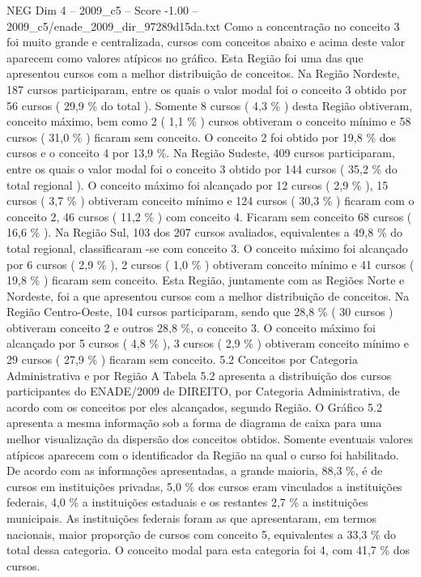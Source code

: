 \begin{textsample}{NEG Dim 4 – 2009\_c5 – Score -1.00 – 2009\_c5/enade\_2009\_dir\_97289d15da.txt}
Como a concentração no conceito 3 foi muito grande e centralizada, cursos com conceitos abaixo e acima deste valor aparecem como valores atípicos no gráfico.
Esta Região foi uma das que apresentou cursos com a melhor distribuição de conceitos.
Na Região Nordeste, 187 cursos participaram, entre os quais o valor modal foi o conceito 3 obtido por 56 cursos ( 29,9 \% do total ).
Somente 8 cursos ( 4,3 \% ) desta Região obtiveram, conceito máximo, bem como 2 ( 1,1 \% ) cursos obtiveram o conceito mínimo e 58 cursos ( 31,0 \% ) ficaram sem conceito.
O conceito 2 foi obtido por 19,8 \% dos cursos e o conceito 4 por 13,9 \%.
Na Região Sudeste, 409 cursos participaram, entre os quais o valor modal foi o conceito 3 obtido por 144 cursos ( 35,2 \% do total regional ).
O conceito máximo foi alcançado por 12 cursos ( 2,9 \% ), 15 cursos ( 3,7 \% ) obtiveram conceito mínimo e 124 cursos ( 30,3 \% ) ficaram com o conceito 2, 46 cursos ( 11,2 \% ) com conceito 4.
Ficaram sem conceito 68 cursos ( 16,6 \% ).
Na Região Sul, 103 dos 207 cursos avaliados, equivalentes a 49,8 \% do total regional, classificaram -se com conceito 3.
O conceito máximo foi alcançado por 6 cursos ( 2,9 \% ), 2 cursos ( 1,0 \% ) obtiveram conceito mínimo e 41 cursos ( 19,8 \% ) ficaram sem conceito.
Esta Região, juntamente com as Regiões Norte e Nordeste, foi a que apresentou cursos com a melhor distribuição de conceitos.
Na Região Centro-Oeste, 104 cursos participaram, sendo que 28,8 \% ( 30 cursos ) obtiveram conceito 2 e outros 28,8 \%, o conceito 3.
O conceito máximo foi alcançado por 5 cursos ( 4,8 \% ), 3 cursos ( 2,9 \% ) obtiveram conceito mínimo e 29 cursos ( 27,9 \% ) ficaram sem conceito. 5.2 Conceitos por Categoria Administrativa e por Região A Tabela 5.2 apresenta a distribuição dos cursos participantes do ENADE/2009 de DIREITO, por Categoria Administrativa, de acordo com os conceitos por eles alcançados, segundo Região.
O Gráfico 5.2 apresenta a mesma informação sob a forma de diagrama de caixa para uma melhor visualização da dispersão dos conceitos obtidos.
Somente eventuais valores atípicos aparecem com o identificador da Região na qual o curso foi habilitado.
De acordo com as informações apresentadas, a grande maioria, 88,3 \%, é de cursos em instituições privadas, 5,0 \% dos cursos eram vinculados a instituições federais, 4,0 \% a instituições estaduais e os restantes 2,7 \% a instituições municipais.
As instituições federais foram as que apresentaram, em termos nacionais, maior proporção de cursos com conceito 5, equivalentes a 33,3 \% do total dessa categoria.
O conceito modal para esta categoria foi 4, com 41,7 \% dos cursos.

\end{textsample}
